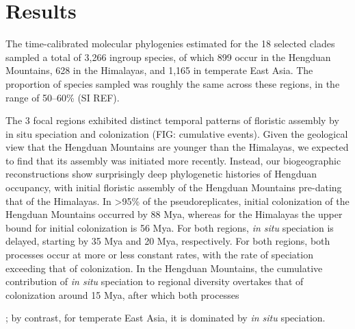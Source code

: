 \section{Results}

The time-calibrated molecular phylogenies estimated for the 18 selected clades sampled a total of 3,266 ingroup species, of which 899 occur in the Hengduan Mountains, 628 in the Himalayas, and 1,165 in temperate East Asia. The proportion of species sampled was roughly the same across these regions, in the range of 50--60\% (SI REF).

The 3 focal regions exhibited distinct temporal patterns of floristic assembly by in situ speciation and colonization (FIG: cumulative events). Given the geological view that the Hengduan Mountains are younger than the Himalayas, we expected to find that its assembly was initiated more recently. Instead, our biogeographic reconstructions show surprisingly deep phylogenetic histories of Hengduan occupancy, with initial floristic assembly of the Hengduan Mountains pre-dating that of the Himalayas. In >95\% of the pseudoreplicates, initial colonization of the Hengduan Mountains occurred by 88 Mya, whereas for the Himalayas the upper bound for initial colonization is 56 Mya. For both regions, \textit{in situ} speciation is delayed, starting by 35 Mya and 20 Mya, respectively. For both regions, both processes occur at more or less constant rates, with the rate of speciation exceeding that of colonization. In the Hengduan Mountains, the cumulative contribution of \textit{in situ} speciation to regional diversity overtakes that of colonization around 15 Mya, after which both processes 

; by contrast, for temperate East Asia, it is dominated by \textit{in situ} speciation. 